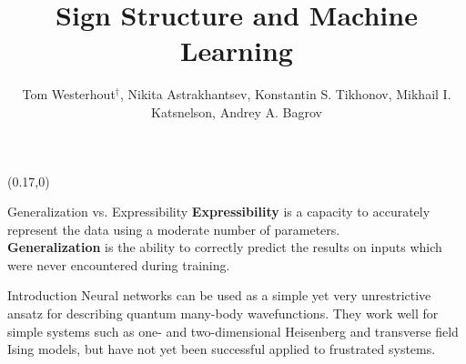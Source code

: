 \documentclass[final]{beamer}
\title{Sign Structure and Machine Learning} %
\author{Tom Westerhout$^\dagger$, Nikita Astrakhantsev, Konstantin S. Tikhonov, Mikhail I. Katsnelson, Andrey A. Bagrov}
\institute{$\dagger$\ Theory of Condensed Matter, Radboud University} %
\begin{document}
\begin{textblock}{4.6}(0.17,0)
    \vspace{0.5cm}
    \begin{figure}[h]
    \end{figure}

    \vspace{0.5cm}
    \begin{alertblock}{Generalization vs. Expressibility}
        \textbf{Expressibility} is a capacity to accurately represent the data using a
        moderate number of parameters. \\
        \textbf{Generalization} is the ability to correctly predict the results
        on inputs which were never encountered during training.
    \end{alertblock} 

    \begin{block}{Introduction}
        Neural networks can be used as a simple yet very unrestrictive ansatz
        for describing quantum many-body wavefunctions. They work well for
        simple systems such as one- and two-dimensional Heisenberg and
        transverse field Ising models, but have not yet been successful applied
        to frustrated systems.


\end{block}
\end{textblock}
\end{document}
